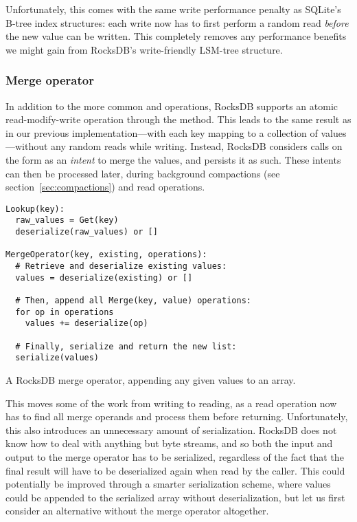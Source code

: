 Unfortunately, this comes with the same write performance penalty as SQLite's
B-tree index structures: each write now has to first perform a random read
\textit{before} the new value can be written. This completely removes any
performance benefits we might gain from RocksDB's write-friendly LSM-tree
structure.

\subsubsection{Merge operator}

In addition to the more common  and  operations, RocksDB
supports an atomic read-modify-write operation through the 
method.
This leads to the same result as in our previous implementation---with each key
mapping to a collection of values---without any random reads while writing.
Instead, RocksDB considers calls on the form  as an
\textit{intent} to merge the values, and persists it as such. These intents can
then be processed later, during background compactions (see
section~\ref{sec:compactions}) and read operations.

\begin{listing}[H]
  \begin{verbatim}
Lookup(key):
  raw_values = Get(key)
  deserialize(raw_values) or []

MergeOperator(key, existing, operations):
  # Retrieve and deserialize existing values:
  values = deserialize(existing) or []

  # Then, append all Merge(key, value) operations:
  for op in operations
    values += deserialize(op)

  # Finally, serialize and return the new list:
  serialize(values)
  \end{verbatim}

  \caption{A RocksDB merge operator, appending any given values to an array.}\label{lst:merge-fn}
\end{listing}

This moves some of the work from writing to reading, as a read operation now has
to find all merge operands and process them before returning. Unfortunately,
this also introduces an unnecessary amount of serialization. RocksDB does not
know how to deal with anything but byte streams, and so both the input and
output to the merge operator has to be serialized, regardless of the fact that
the final result will have to be deserialized again when read by the caller.
This could potentially be improved through a smarter serialization scheme, where
values could be appended to the serialized array without deserialization, but
let us first consider an alternative without the merge operator altogether.

